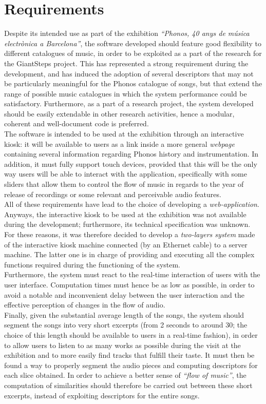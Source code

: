 \section{Requirements}
\label{sec:requirements}
Despite its intended use as part of the exhibition \textit{``Phonos, 40 anys de música electrònica a Barcelona''}, the software developed should feature good flexibility to different catalogues of music, in order to be exploited as a part of the research for the GiantSteps project. This has represented a strong requirement during the development, and has induced the adoption of several descriptors that may not be particularly meaningful for the Phonos catalogue of songs, but that extend the range of possible music catalogues in which the system performance could be satisfactory. Furthermore, as a part of a research project, the system developed should be easily extendable in other research activities, hence a modular, coherent and well-document code is preferred. \\
The software is intended to be used at the exhibition through an interactive kiosk: it will be available to users as a link inside a more general \textit{webpage} containing several information regarding Phonos history and instrumentation. In addition, it must fully support touch devices, provided that this will be the only way users will be able to interact with the application, specifically with some sliders that allow them to control the flow of music in regards to the year of release of recordings or some relevant and perceivable audio features. \\ 
All of these requirements have lead to the choice of developing a \textit{web-application}. 
Anyways, the interactive kiosk to be used at the exhibition was not available during the development; furthermore, its technical specification was unknown. For these reasons, it was therefore decided to develop a \textit{two-layers system} made of the interactive kiosk machine connected (by an Ethernet cable) to a server machine. The latter one is in charge of providing and executing all the complex functions required during the functioning of the system. \\
Furthermore, the system must react to the real-time interaction of users with the user interface. Computation times must hence be as low as possible, in order to avoid a notable and inconvenient delay between the user interaction and the effective perception of changes in the flow of audio. \\
Finally, given the substantial average length of the songs, the system should segment the songs into very short excerpts (from 2 seconds to around 30; the choice of this length should be available to users in a real-time fashion), in order to allow users to listen to as many works as possible during the visit at the exhibition and to more easily find tracks that fulfill their taste. It must then be found a way to properly segment the audio pieces and computing descriptors for each slice obtained. In order to achieve a better sense of \textit{``flow of music''}, the computation of similarities should therefore be carried out between these short excerpts, instead of exploiting descriptors for the entire songs.


